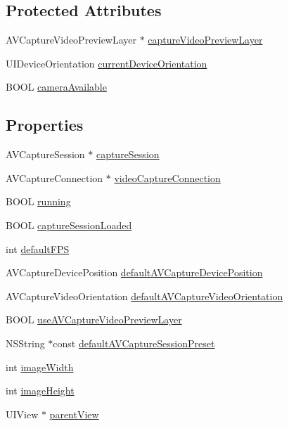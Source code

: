 \subsection*{Protected Attributes}
\begin{DoxyCompactItemize}
\item 
A\-V\-Capture\-Video\-Preview\-Layer $\ast$ \hyperlink{interfaceCvAbstractCamera_ab2584923d445cacd3f1bf37bc917a260}{capture\-Video\-Preview\-Layer}
\item 
U\-I\-Device\-Orientation \hyperlink{interfaceCvAbstractCamera_aa46cf6e9afd8398d35b99cef4f3247f7}{current\-Device\-Orientation}
\item 
B\-O\-O\-L \hyperlink{interfaceCvAbstractCamera_acfd8f1830e5588430db00b66b0361323}{camera\-Available}
\end{DoxyCompactItemize}
\subsection*{Properties}
\begin{DoxyCompactItemize}
\item 
A\-V\-Capture\-Session $\ast$ \hyperlink{interfaceCvAbstractCamera_ac2947d7a3dad195115bb8e0aadd5f9b7}{capture\-Session}
\item 
A\-V\-Capture\-Connection $\ast$ \hyperlink{interfaceCvAbstractCamera_a1af316db920014c2b17c51de1abef07c}{video\-Capture\-Connection}
\item 
B\-O\-O\-L \hyperlink{interfaceCvAbstractCamera_ac14f0dc858286d0879c524988eded738}{running}
\item 
B\-O\-O\-L \hyperlink{interfaceCvAbstractCamera_a0433c6ce2417ab9f6ab3bcb6bf4914e5}{capture\-Session\-Loaded}
\item 
int \hyperlink{interfaceCvAbstractCamera_a4191912661631d746270dc24a0b9a902}{default\-F\-P\-S}
\item 
A\-V\-Capture\-Device\-Position \hyperlink{interfaceCvAbstractCamera_a038fae0411c8b8fe316c27287a00f745}{default\-A\-V\-Capture\-Device\-Position}
\item 
A\-V\-Capture\-Video\-Orientation \hyperlink{interfaceCvAbstractCamera_a3190de91139b32e8bf15d47e8a75e97d}{default\-A\-V\-Capture\-Video\-Orientation}
\item 
B\-O\-O\-L \hyperlink{interfaceCvAbstractCamera_a583bbd0eb3598f96ad1f42243c63ef99}{use\-A\-V\-Capture\-Video\-Preview\-Layer}
\item 
N\-S\-String $\ast$const \hyperlink{interfaceCvAbstractCamera_aca0049c0c6ec21621c463dacaa6ea6aa}{default\-A\-V\-Capture\-Session\-Preset}
\item 
int \hyperlink{interfaceCvAbstractCamera_a9ce69702c4608e60386884e5f7c233cf}{image\-Width}
\item 
int \hyperlink{interfaceCvAbstractCamera_a3aeba5c58aa31e3fc1b61819646d3b85}{image\-Height}
\item 
U\-I\-View $\ast$ \hyperlink{interfaceCvAbstractCamera_af1eb7228d9d71db11f985dafc29ebbfd}{parent\-View}
\end{DoxyCompactItemize}


